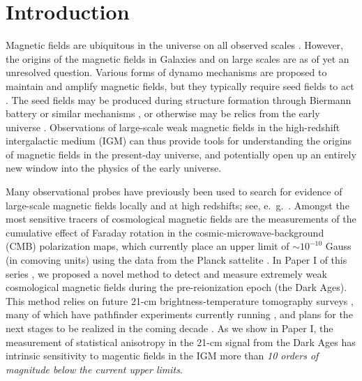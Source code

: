 \section{Introduction}
\label{sec:intro}

Magnetic fields are ubiquitous in the universe on all observed scales \cite{2013A&ARv..21...62D,Vallee04,Neronov10,2005LNP...664...89W,2012SSRv..166..215B}. However, the origins of the magnetic fields in Galaxies and on large scales are as of yet an unresolved question. Various forms of dynamo mechanisms \cite{2013PhRvE..87e3110P} are proposed to maintain and amplify magnetic fields, but they typically require seed fields to act \cite{2013A&ARv..21...62D}. The seed fields may be produced during structure formation through Biermann battery or similar mechanisms \cite{Naoz13,2013PhRvL.111e1303N}, or otherwise may be relics from the early universe \cite{2013A&ARv..21...62D,2012SSRv..166...37W,2014JCAP...05..040K}. Observations of large-scale weak magnetic fields in the high-redshift intergalactic medium (IGM) can thus provide tools for understanding the origins of magnetic fields in the present-day universe, and potentially open up an entirely new window into the physics of the early universe.

Many observational probes have previously been used to search for evidence of large-scale magnetic fields locally and at high redshifts; see, e.~g.~\cite{Yamazaki10,Blasi99,Tavecchio10,Dolag11,2005LNP...664...89W,2014JCAP...01..009K,2013ApJ...770...47K,2014PhRvD..89j3522S,2006MNRAS.372.1060T,2009ApJ...692..236S}. Amongst the most sensitive tracers of cosmological magnetic fields are the measurements of the cumulative effect of Faraday rotation in the cosmic-microwave-background (CMB) polarization maps, which currently place an upper limit of $\sim$$10^{-10}$ Gauss (in comoving units) using the data from the Planck sattelite \cite{2015arXiv150201594P}. In Paper I of this series \cite{2014arXiv1410.2250V}, we proposed a novel method to detect and measure extremely weak cosmological magnetic fields during the pre-reionization epoch (the Dark Ages). This method relies on future 21-cm brightness-temperature tomography surveys \cite{1997ApJ...475..429M,2004PhRvL..92u1301L}, many of which have pathfinder experiments currently running \cite{2012arXiv1201.1700G,2011AAS...21813206B,2014ApJ...788..106P,2008arXiv0802.1727C,Vanderlinde14,2015AAS...22532803D}, and plans for the next stages to be realized in the coming decade \cite{2008arXiv0802.1727C,2015AAS...22532803D}. As we show in Paper I, the measurement of statistical anisotropy in the 21-cm signal from the Dark Ages has intrinsic sensitivity to magentic fields in the IGM more than \textit{10 orders of magnitude below the current upper limits}. 

